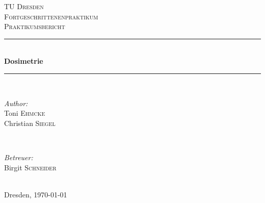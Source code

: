 \documentclass[11pt,a4paper]{report}
\begin{document}
\begin{titlepage}
\newcommand{\HRule}{\rule{\linewidth}{0.5mm}} %

\center %
 

\textsc{\LARGE TU Dresden}\\[1.5cm] %
\textsc{\Large Fortgeschrittenenpraktikum}\\[0.5cm] %
\textsc{\Large Praktikumsbericht}\\[0.5cm] %


\HRule \\[0.4cm]
{ \huge \bfseries Dosimetrie}\\[0.4cm] %
\HRule \\[1.5cm]
 

\begin{minipage}{0.4\textwidth}
\begin{flushleft} \large
\emph{Author:}\\
Toni \textsc{Ehmcke}\\
Christian \textsc{Siegel}
\end{flushleft}
\end{minipage}
~
\begin{minipage}{0.4\textwidth}
\begin{flushright} \large
\emph{Betreuer:} \\
Birgit \textsc{Schneider} %
\end{flushright}
\end{minipage}\\[4cm]


{\large Dresden, \today}\\[3cm] %

\vfill 

\end{titlepage}
\end{document}
